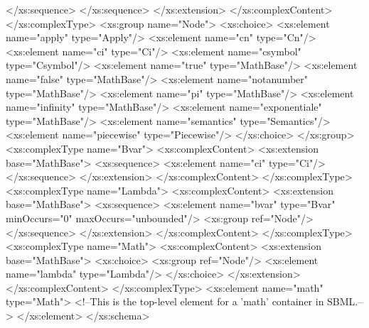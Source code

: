 \begin{example}
\begin{footnotesize}
                    </xs:sequence>
                </xs:sequence>
            </xs:extension>
        </xs:complexContent>
    </xs:complexType>
    <xs:group name="Node">
        <xs:choice>
            <xs:element name="apply" type="Apply"/>
            <xs:element name="cn" type="Cn"/>
            <xs:element name="ci" type="Ci"/>
            <xs:element name="csymbol" type="Csymbol"/>
            <xs:element name="true" type="MathBase"/>
            <xs:element name="false" type="MathBase"/>
            <xs:element name="notanumber" type="MathBase"/>
            <xs:element name="pi" type="MathBase"/>
            <xs:element name="infinity" type="MathBase"/>
            <xs:element name="exponentiale" type="MathBase"/>
            <xs:element name="semantics" type="Semantics"/>
            <xs:element name="piecewise" type="Piecewise"/>
        </xs:choice>
    </xs:group>
    <xs:complexType name="Bvar">
        <xs:complexContent>
            <xs:extension base="MathBase">
                <xs:sequence>
                    <xs:element name="ci" type="Ci"/>
                </xs:sequence>
            </xs:extension>
        </xs:complexContent>
    </xs:complexType>
    <xs:complexType name="Lambda">
        <xs:complexContent>
            <xs:extension base="MathBase">
                <xs:sequence>
                    <xs:element name="bvar" type="Bvar" minOccurs="0" maxOccurs="unbounded"/>
                    <xs:group ref="Node"/>
                </xs:sequence>
            </xs:extension>
        </xs:complexContent>
    </xs:complexType>
    <xs:complexType name="Math">
        <xs:complexContent>
            <xs:extension base="MathBase">
                <xs:choice>
                    <xs:group ref="Node"/>
                    <xs:element name="lambda" type="Lambda"/>
                </xs:choice>
            </xs:extension>
        </xs:complexContent>
    </xs:complexType>
    <xs:element name="math" type="Math">
        <!--This is the top-level element for a 'math' container in SBML.-->
    </xs:element>
</xs:schema>
\end{footnotesize}
\end{example}

